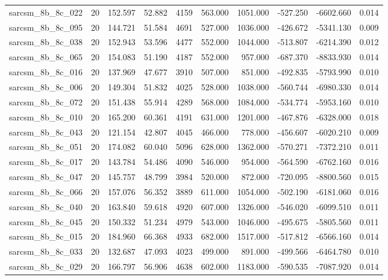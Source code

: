 \begin{tabular}{lrrrrrrrrr}
sarcsm\_8b\_8c\_022 & 20 & 152.597 & 52.882 & 4159 & 563.000 & 1051.000 & -527.250 & -6602.660 & 0.014 \\
sarcsm\_8b\_8c\_095 & 20 & 144.721 & 51.584 & 4691 & 527.000 & 1036.000 & -426.672 & -5341.130 & 0.009 \\
sarcsm\_8b\_8c\_038 & 20 & 152.943 & 53.596 & 4477 & 552.000 & 1044.000 & -513.807 & -6214.390 & 0.012 \\
sarcsm\_8b\_8c\_065 & 20 & 154.083 & 51.190 & 4187 & 552.000 & 957.000 & -687.370 & -8833.930 & 0.014 \\
sarcsm\_8b\_8c\_016 & 20 & 137.969 & 47.677 & 3910 & 507.000 & 851.000 & -492.835 & -5793.990 & 0.010 \\
sarcsm\_8b\_8c\_006 & 20 & 149.304 & 51.832 & 4025 & 528.000 & 1038.000 & -560.744 & -6980.330 & 0.014 \\
sarcsm\_8b\_8c\_072 & 20 & 151.438 & 55.914 & 4289 & 568.000 & 1084.000 & -534.774 & -5953.160 & 0.010 \\
sarcsm\_8b\_8c\_010 & 20 & 165.200 & 60.361 & 4191 & 631.000 & 1201.000 & -467.876 & -6328.000 & 0.018 \\
sarcsm\_8b\_8c\_043 & 20 & 121.154 & 42.807 & 4045 & 466.000 & 778.000 & -456.607 & -6020.210 & 0.009 \\
sarcsm\_8b\_8c\_051 & 20 & 174.082 & 60.040 & 5096 & 628.000 & 1362.000 & -570.271 & -7372.210 & 0.011 \\
sarcsm\_8b\_8c\_017 & 20 & 143.784 & 54.486 & 4090 & 546.000 & 954.000 & -564.590 & -6762.160 & 0.016 \\
sarcsm\_8b\_8c\_047 & 20 & 145.757 & 48.799 & 3984 & 520.000 & 872.000 & -720.095 & -8800.560 & 0.015 \\
sarcsm\_8b\_8c\_066 & 20 & 157.076 & 56.352 & 3889 & 611.000 & 1054.000 & -502.190 & -6181.060 & 0.016 \\
sarcsm\_8b\_8c\_040 & 20 & 163.840 & 59.618 & 4920 & 607.000 & 1326.000 & -546.020 & -6099.510 & 0.011 \\
sarcsm\_8b\_8c\_045 & 20 & 150.332 & 51.234 & 4979 & 543.000 & 1046.000 & -495.675 & -5805.560 & 0.011 \\
sarcsm\_8b\_8c\_015 & 20 & 184.960 & 66.368 & 4933 & 682.000 & 1517.000 & -517.812 & -6566.160 & 0.014 \\
sarcsm\_8b\_8c\_033 & 20 & 132.687 & 47.093 & 4023 & 499.000 & 891.000 & -499.566 & -6464.780 & 0.010 \\
sarcsm\_8b\_8c\_029 & 20 & 166.797 & 56.906 & 4638 & 602.000 & 1183.000 & -590.535 & -7087.920 & 0.014 \\

\end{tabular}
